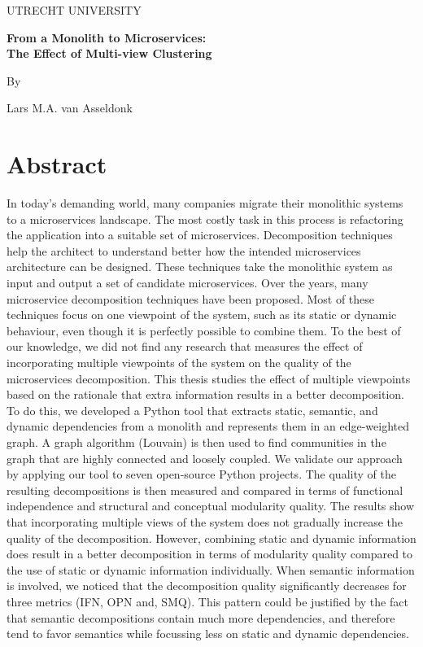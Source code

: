 \thispagestyle{plain}
\begin{center}
    UTRECHT UNIVERSITY
    
    \vspace*{0.4cm}
    
    \Large
    \textbf{From a Monolith to Microservices:\\ The Effect of Multi-view Clustering}
        
    \vspace{0.4cm}
    
    \large{By}
    
    \vspace{0.2cm}
    
    \large{Lars M.A. van Asseldonk}
       
    \section*{Abstract}
\end{center}

In today's demanding world, many companies migrate their monolithic systems to a microservices landscape. The most costly task in this process is refactoring the application into a suitable set of microservices. Decomposition techniques help the architect to understand better how the intended microservices architecture can be designed. These techniques take the monolithic system as input and output a set of candidate microservices. Over the years, many microservice decomposition techniques have been proposed. 
Most of these techniques focus on one viewpoint of the system, such as its static or dynamic behaviour, even though it is perfectly possible to combine them. 
To the best of our knowledge, we did not find any research that measures the effect of incorporating multiple viewpoints of the system on the quality of the microservices decomposition. 
This thesis studies the effect of multiple viewpoints based on the rationale that extra information results in a better decomposition. To do this, we developed a Python tool that extracts static, semantic, and dynamic dependencies from a monolith and represents them in an edge-weighted graph. 
A graph algorithm (Louvain) is then used to find communities in the graph that are highly connected and loosely coupled. We validate our approach by applying our tool to seven open-source Python projects. The quality of the resulting decompositions is then measured and compared in terms of functional independence and structural and conceptual modularity quality. The results show that incorporating multiple views of the system does not gradually increase the quality of the decomposition. However, combining static and dynamic information does result in a better decomposition in terms of modularity quality compared to the use of static or dynamic information individually. When semantic information is involved, we noticed that the decomposition quality significantly decreases for three metrics (IFN, OPN and, SMQ). 
This pattern could be justified by the fact that semantic decompositions contain much more dependencies, and therefore tend to favor semantics while focussing less on static and dynamic dependencies.